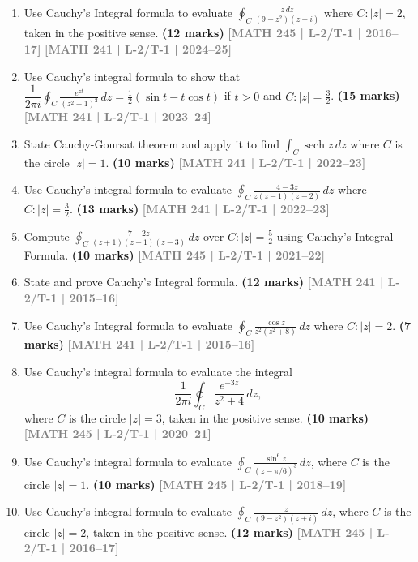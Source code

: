 \documentclass[12pt]{article}
\newcommand{\yr}[1]{\hfill\textcolor{gray}{\small\textbf{[#1]}}}
\newcommand{\mk}[1]{\textcolor{orange!70!black}{\small\textbf{(#1 marks)}}}
\begin{document}
\begin{enumerate}


\item Use Cauchy's Integral formula to evaluate $\displaystyle\oint_{C}\frac{z\,dz}{(9-z^{2})(z+i)}$ where $C\colon|z|=2$, taken in the positive sense.
\mk{12} \yr{MATH 245 | L-2/T-1 | 2016--17} \yr{MATH 241 | L-2/T-1 | 2024--25}

\item Use Cauchy's integral formula to show that $\dfrac{1}{2\pi i}\displaystyle\oint_{C}\frac{e^{zt}}{(z^{2}+1)^{2}}\,dz=\tfrac{1}{2}(\sin t - t\cos t)$ if $t>0$ and $C\colon|z|=\tfrac{3}{2}$.
\mk{15} \yr{MATH 241 | L-2/T-1 | 2023--24}

\item State Cauchy-Goursat theorem and apply it to find $\displaystyle\int_{C}\operatorname{sech}z\,dz$ where $C$ is the circle $|z|=1$.
\mk{10} \yr{MATH 241 | L-2/T-1 | 2022--23}

\item Use Cauchy's integral formula to evaluate $\displaystyle\oint_{C}\frac{4-3z}{z(z-1)(z-2)}\,dz$ where $C\colon|z|=\tfrac{3}{2}$.
\mk{13} \yr{MATH 241 | L-2/T-1 | 2022--23}

\item Compute $\displaystyle\oint_{C}\frac{7-2z}{(z+1)(z-1)(z-3)}\,dz$ over $C\colon|z|=\tfrac{5}{2}$ using Cauchy's Integral Formula.
\mk{10} \yr{MATH 245 | L-2/T-1 | 2021--22}

\item State and prove Cauchy's Integral formula.
\mk{12} \yr{MATH 241 | L-2/T-1 | 2015--16}

\item Use Cauchy's Integral formula to evaluate $\displaystyle\oint_{C}\frac{\cos z}{z^{2}(z^{2}+8)}\,dz$ where $C\colon|z|=2$.
\mk{7} \yr{MATH 241 | L-2/T-1 | 2015--16}
  
\item Use Cauchy's integral formula to evaluate the integral
\[
\frac{1}{2\pi i}\oint_{C} \frac{e^{-3z}}{z^{2}+4}\,dz,
\]
where $C$ is the circle $|z|=3$, taken in the positive sense.
\mk{10} \yr{MATH 245 | L-2/T-1 | 2020--21}

\item Use Cauchy's integral formula to evaluate $\displaystyle\oint_{C}\frac{\sin^{6}z}{(z-\pi/6)^{3}}\,dz$, where $C$ is the circle $|z|=1$.
\mk{10} \yr{MATH 245 | L-2/T-1 | 2018--19}

\item Use Cauchy's integral formula to evaluate $\displaystyle\oint_{C}\frac{z}{(9-z^{2})(z+i)}\,dz$, where $C$ is the circle $|z|=2$, taken in the positive sense.
\mk{12} \yr{MATH 245 | L-2/T-1 | 2016--17}


\end{enumerate}
\end{document}
